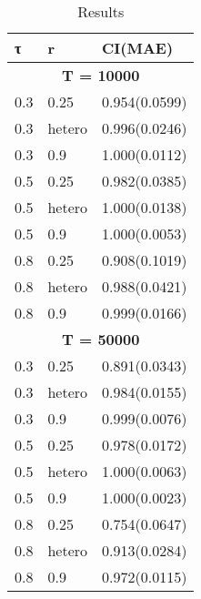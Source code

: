 \begin{table}[htbp]
\centering
\caption{Results}
\label{tab:combined}
\begin{tabular}{lll}
\toprule
τ & r & CI(MAE)\\
\midrule
\multicolumn{3}{c}{\textbf{T = 10000}} \\
\midrule
0.3 & 0.25 & 0.954(0.0599) \\
0.3 & hetero & 0.996(0.0246) \\
0.3 & 0.9 & 1.000(0.0112) \\
\hline
0.5 & 0.25 & 0.982(0.0385) \\
0.5 & hetero & 1.000(0.0138) \\
0.5 & 0.9 & 1.000(0.0053) \\
\hline
0.8 & 0.25 & 0.908(0.1019) \\
0.8 & hetero & 0.988(0.0421) \\
0.8 & 0.9 & 0.999(0.0166) \\
\hline
\multicolumn{3}{c}{\textbf{T = 50000}} \\
\midrule
0.3 & 0.25 & 0.891(0.0343) \\
0.3 & hetero & 0.984(0.0155) \\
0.3 & 0.9 & 0.999(0.0076) \\
\hline
0.5 & 0.25 & 0.978(0.0172) \\
0.5 & hetero & 1.000(0.0063) \\
0.5 & 0.9 & 1.000(0.0023) \\
\hline
0.8 & 0.25 & 0.754(0.0647) \\
0.8 & hetero & 0.913(0.0284) \\
0.8 & 0.9 & 0.972(0.0115) \\
\hline
\bottomrule
\end{tabular}
\end{table}